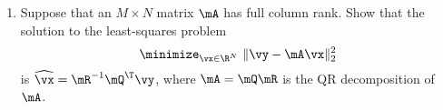 \documentclass[11pt]{article}
\begin{document}
\begin{enumerate}
\begin{enumerate}
	\item Suppose that an $M\times N$ matrix $\mA$ has full column rank.  Show that the solution to the least-squares problem
	\[
		\minimize_{\vx\in\R^N}~\|\vy-\mA\vx\|_2^2
	\]
	is $\widehat\vx = \mR^{-1}\mQ^\T\vy$, where $\mA=\mQ\mR$ is the QR decomposition of $\mA$.
	
	
\end{enumerate}


\end{enumerate}
\end{document}
